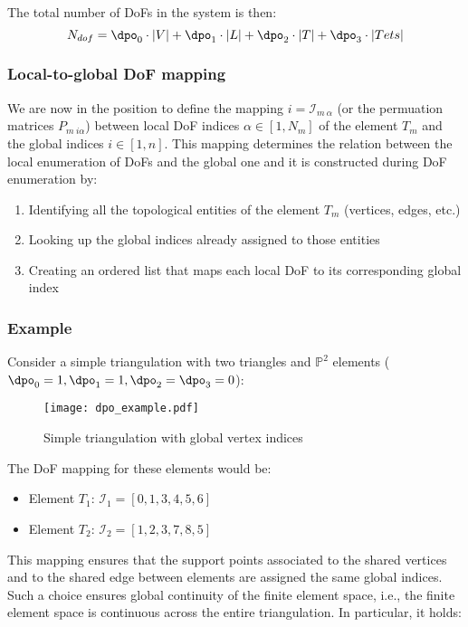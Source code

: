 The total number of DoFs in the system is then:
\[
N_{dof} = \dpo_0 \cdot |V| + \dpo_1 \cdot |L| + \dpo_2 \cdot |T| + \dpo_3 \cdot |Tets|
\]

\subsubsection{Local-to-global DoF mapping}

We are now in the position to define the mapping $i=\mathcal{I}_{m~\alpha}$ (or the permuation matrices $P_{m~i\alpha}$) between local DoF indices $\alpha \in [1,N_m]$ of the element $T_m$ and the global indices $i \in [1, n]$. This mapping determines the relation between the local enumeration of DoFs and the global one and it is constructed during DoF enumeration by:

\begin{enumerate}
  \item Identifying all the topological entities of the element $T_m$ (vertices, edges, etc.)
  \item Looking up the global indices already assigned to those entities
  \item Creating an ordered list that maps each local DoF to its corresponding global index
\end{enumerate}

\subsubsection{Example}

Consider a simple triangulation with two triangles and $\mathbb{P}^2$ elements ($\dpo_0 = 1, \dpo_1 = 1, \dpo_2 = \dpo_3 = 0$):

\begin{figure}[h]
\centering
\texttt{[image: dpo\_example.pdf]}
\caption{Simple triangulation with global vertex indices}
\end{figure}

The DoF mapping for these elements would be:
\begin{itemize}
  \item Element $T_1$: $\mathcal{I}_1 = [0, 1, 3, 4, 5, 6]$
  \item Element $T_2$: $\mathcal{I}_2 = [1, 2, 3, 7, 8, 5]$
\end{itemize}

This mapping ensures that the support points associated to the shared vertices and to the shared edge between elements are assigned the same global indices. Such a choice ensures global continuity of the finite element space, i.e., the finite element space is continuous across the entire triangulation. In particular, it holds:

